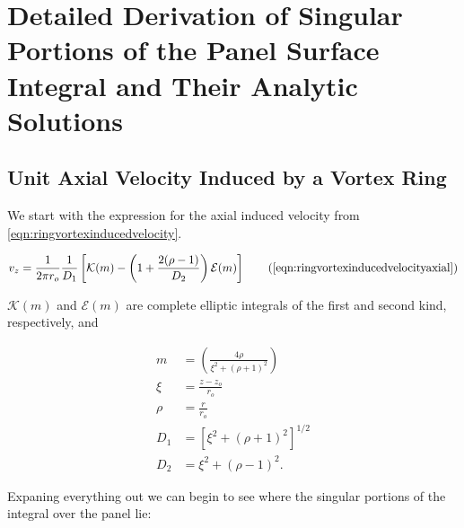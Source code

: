 \section{Detailed Derivation of Singular Portions of the Panel Surface Integral and Their Analytic Solutions}
\label{app:separationofsingularity}

\subsection{Unit Axial Velocity Induced by a Vortex Ring}

We start with the expression for the axial induced velocity from \cref{eqn:ringvortexinducedvelocity}.

\begin{equation}
    v_{z} =  \frac{1}{2 \pi r_o} \frac{1}{D_1} \left[ \mathcal{K}(m) - \left( 1 + \frac{2(\rho-1)}{D_2} \right) \mathcal{E}(m) \right]
    \tag{\ref{eqn:ringvortexinducedvelocityaxial}}
\end{equation}

\where \(\mathcal{K}(m)\) and \(\mathcal{E}(m)\) are complete elliptic integrals of the first and second kind, respectively, and

\[
    \begin{aligned}
    m &= \left( \frac{4\rho}{\xi^2 + (\rho+1)^2} \right) \\%
    \xi &= \frac{z - z_o}{r_o} \\
    \rho &= \frac{r}{r_o} \\
    D_1 &= \left[\xi^2 + (\rho+1)^2\right]^{1/2} \\
    D_2 &= \xi^2 + (\rho - 1)^2.
    \end{aligned}
\]

\noindent Expaning everything out we can begin to see where the singular portions of the integral over the panel lie:

